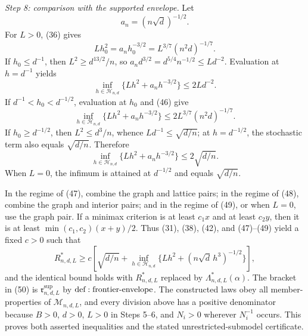 \textit{Step 8: comparison with the supported envelope.}
Let
\[
 a_n=(n\sqrt d)^{-1/2}.
\]
For \(L>0\), (36) gives
\[
 Lh_0^2=a_nh_0^{-3/2}=L^{3/7}(n^2d)^{-1/7}.
\tag{46}
\]
If \(h_0\leq d^{-1}\), then \(L^2\geq d^{13/2}/n\), so
\(a_nd^{3/2}=d^{5/4}n^{-1/2}\leq Ld^{-2}\).  Evaluation at \(h=d^{-1}\) yields
\[
 \inf_{h\in\mathcal H_{n,d}}\{Lh^2+a_nh^{-3/2}\}
 \leq2Ld^{-2}.
\tag{47}
\]
If \(d^{-1}<h_0<d^{-1/2}\), evaluation at \(h_0\) and (46) give
\[
 \inf_{h\in\mathcal H_{n,d}}\{Lh^2+a_nh^{-3/2}\}
 \leq2L^{3/7}(n^2d)^{-1/7}.
\tag{48}
\]
If \(h_0\geq d^{-1/2}\), then \(L^2\leq d^3/n\), whence \(Ld^{-1}\leq\sqrt{d/n}\); at \(h=d^{-1/2}\), the stochastic term also equals \(\sqrt{d/n}\).  Therefore
\[
 \inf_{h\in\mathcal H_{n,d}}\{Lh^2+a_nh^{-3/2}\}
 \leq2\sqrt{d/n}.
\tag{49}
\]
When \(L=0\), the infimum is attained at \(d^{-1/2}\) and equals \(\sqrt{d/n}\).

In the regime of (47), combine the graph and lattice pairs; in the regime of (48), combine the graph and interior pairs; and in the regime of (49), or when \(L=0\), use the graph pair.  If a minimax criterion is at least \(c_1x\) and at least \(c_2y\), then it is at least \(\min(c_1,c_2)(x+y)/2\).  Thus (31), (38), (42), and (47)--(49) yield a fixed \(c>0\) such that
\[
 R^*_{n,d,L}\geq c\left[\sqrt{d/n}+
 \inf_{h\in\mathcal H_{n,d}}\{Lh^2+(n\sqrt d\,h^3)^{-1/2}\}\right],
\tag{50}
\]
and the identical bound holds with \(R^*_{n,d,L}\) replaced by \(\Lambda^*_{n,d,L}(\alpha)\).  The bracket in (50) is \(\mathfrak r^{\mathrm{sup}}_{n,d,L}\) by \({\rm def:frontier\text{-}envelope}\).  The constructed laws obey all member-properties of \(\mathcal M_{n,d,L}\), and every division above has a positive denominator because \(B>0\), \(d>0\), \(L>0\) in Steps 5--6, and \(N_i>0\) wherever \(N_i^{-1}\) occurs.  This proves both asserted inequalities and the stated unrestricted-submodel certificate.